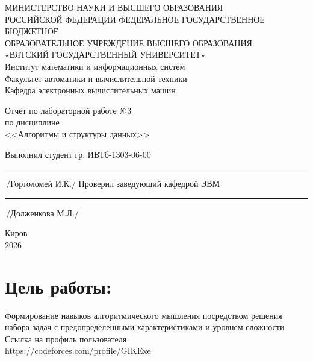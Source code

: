 \documentclass[oneside,a4paper,14pt]{extarticle} %
\begin{document}
	\newpage\thispagestyle{empty}
	\begin{center}
		МИНИСТЕРСТВО НАУКИ И ВЫСШЕГО ОБРАЗОВАНИЯ\\
			РОССИЙСКОЙ ФЕДЕРАЦИИ
			ФЕДЕРАЛЬНОЕ ГОСУДАРСТВЕННОЕ БЮДЖЕТНОЕ\\
			ОБРАЗОВАТЕЛЬНОЕ
			УЧРЕЖДЕНИЕ ВЫСШЕГО ОБРАЗОВАНИЯ\\
			«ВЯТСКИЙ ГОСУДАРСТВЕННЫЙ УНИВЕРСИТЕТ»\\
			Институт математики и информационных систем\\
			Факультет автоматики и вычислительной техники\\
			Кафедра электронных вычислительных машин
	\end{center}
	\vspace{20mm}

	\begin{center}
		Отчёт по лабораторной работе №3\\
		по дисциплине\\
		<<Алгоритмы и структуры данных>>\\
	\end{center}
	\vspace{48mm}

	\noindent
	Выполнил студент гр. ИВТб-1303-06-00 \hfill \rule[-0,5mm]{30mm}{0.15mm}\,/Гортоломей И.К./
	\newline
	Проверил заведующий кафедрой ЭВМ \hfill \rule[-0,5mm]{30mm}{0.15mm}\,/Долженкова М.Л./

	\vfill
	\begin{center}
		Киров\\
		2026
	\end{center}

	\newpage
	\thispagestyle{empty}

	\section*{Цель работы:}
	Формирование навыков алгоритмического мышления посредством решения набора
	задач с предопределенными характеристиками и уровнем сложности \\
	\newline 
	Ссылка на профиль пользователя: \\
	\indent
	https://codeforces.com/profile/GIKExe
\end{document}
